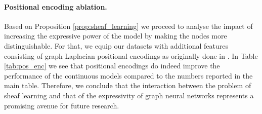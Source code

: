 \documentclass{article}
\begin{document}
\paragraph{Positional encoding ablation.} Based on Proposition \ref{prop:sheaf_learning} we proceed to analyse the impact of increasing the expressive power of the model by making the nodes more distinguishable. For that, we equip our datasets with additional features consisting of graph Laplacian positional encodings as originally done in \citet{dwivedi2020benchmarkgnns}. In Table \ref{tab:pos_enc} we see that positional encodings do indeed improve the performance of the continuous models compared to the numbers reported in the main table. Therefore, we conclude that the interaction between the problem of sheaf learning and that of the expressivity of graph neural networks represents a promising avenue for future research. 

\begin{table*}[ht]
    \centering
    \caption{Ablation study for positional encodings. Positional encodings improve performance on some of our models.}
    \label{tab:pos_enc}
\end{table*} 
\end{document}
